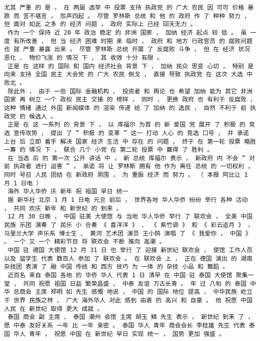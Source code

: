 \documentclass{article}
\begin{document}
\begin{Verbatim}[commandchars=\\\{\}]
 尤其 严重 的 是 ， 在 两届 选举 中 投票 支持 执政党 的 广大 农民 因 可可 价格 暴跌 而 苦不堪言 ， 怨声四起 。 尽管 罗林斯 总统 和 他 的 政府 作 了 种种 努力 ， 但 面对 如此 之多 的 经济 问题 ， 政府 实际上 已经 回天无力 。 
 作为 一个 保持 近 20 年 政治 稳定 的 非洲 国家 ， 加纳 经济 起点 较 低 。 虽 一度 有所改善 ， 但 当 经济 困难 时期 来 临时 ， 政府 和 地方 行政官员 的 腐败问题 也 就 严重 暴露 出来 。 尽管 罗林斯 总统 开展 了 反腐败 斗争 ， 但 在 经济 状况 恶化 、 物价飞涨 的 情况 下 ， 其 收效 十分 有限 。 
 正是 在 这样 的 国际 和 国内 经济社会 背景 下 ， 加纳 民众 思变 心切 ， 特别 是 向来 支持 全国 民主 大会党 的 广大 农民 倒戈 ， 直接 导致 执政党 在 这次 大选 中 败北 。 
 除此外 ， 由于 一些 国际 金融机构 、 投资者 和 舆论 也 希望 加纳 能为 其它 非洲 国家 再 树立 一个 政权 民主 交接 的 榜样 ， 同时 ， 更换 政府 也 有利于 反腐败 ， 这种 情绪 通过 外国 新闻媒体 的 渲染 传递 给 了 加纳 的 选民 ， 自然 不利于 前 执政党 的 候选人 。 
 正是 在 这 一系列 的 背景 下 ， 以 库福尔 为首 的 新 爱国 党 展开 了 积极 的 竞选 宣传攻势 ， 提出 了 “ 积极 的 变革 ” 这一 打动 人心 的 竞选 口号 ， 并 承诺 上台 后 立即 着手 解决 国家 经济 生活 中 存在 的 问题 ， 终于 在 第一轮 投票 略胜一筹 的 情况 下 ， 联合 几个 小党 在 第二轮 投票 中 赢得 了 胜利 。 
 在 当选 后 的 第一次 公开 讲话 中 ， 新 总统 库福尔 表示 ， 新政府 内 不会 “ 对前 执政者 进行 迫害 ” ， 承诺 将 让 罗林斯 拥有 他 作为 离任 总统 的 一切权利 ， 同时 号召 人民 团结 在 新政府 周围 ， 为 重振 经济 而 努力 。 （ 本报 阿比让 1 月 1 日电 ） 
 海外 华人华侨 庆 新年 祝 祖国 早日 统一 
 据 新华社 北京 1 月 1 日电 元旦 前后 ， 世界各地 华人华侨 纷纷 举行 各种 活动 ， 共同 欢庆 新年 和 新世纪 的 到来 。 
 12 月 30 日晚 ， 中国 驻美 大使馆 与 当地 华人华侨 举行 了 联欢会 ， 全美 中国 民族 乐团 演奏 了 民乐 小 合奏 《 喜洋洋 》 、 《 紫竹调 》 和 《 彩云追月 》 ， 马里兰大学 声乐系 博士生 、 黄河 艺术团 演员 王小鸽 演唱 了 《 我爱你 ， 中国 》 。 一个 又 一个 精彩节目 将 联欢会 不断 推向 高潮 。 
 中国 驻 德国 大使馆 12 月 31 日 也 举行 了 迎接 新世纪 联欢会 ， 使馆 工作人员 以及 留学生 代表 数百人 参加 了 联欢会 。 在 联欢会 上 ， 正在 德国 演出 的 湖南 杂技团 表演 了 融 中国 传统 和 西方 技巧 为 一体 的 杂技 小品 和 舞蹈 。 
 近百名 来自 泰国 各地 的 华侨 华人 代表 1 日 清早 在 中国 驻 泰国 大使馆 聚集一堂 ， 共同 祝愿 祖国 日益 繁荣昌盛 ， 中泰 友谊 万古长青 。 年 过 八旬 的 泰国 中华 总商会 主席 郑明 如 先生 感慨 地说 ， 中国 的 国际 地位 提高 ， 中华民族 屹立 于 世界 民族之林 ， 广大 海外华人 对此 感到 由衷 的 高兴 和 自豪 。 他 祝愿 中国 人民 在 新世纪 取得 更大 成就 。 
 泰国 商会 副 主席 、 泰国 潮州 会馆 主席 胡玉 鳞 先生 表示 ， 新世纪 到来 了 ， 愿 中泰 友好关系 一年 比 一年 亲密 。 泰国 华人 青年 商会会长 李桂雄 先生 代表 泰国 华人 青年 ， 祝愿 中国 在 新世纪 早日 实现 统一 ， 国势 更加 强盛 。 

\end{Verbatim}
\end{document}

